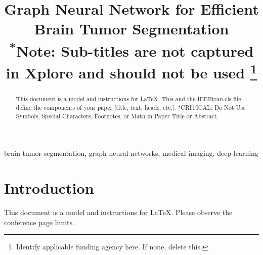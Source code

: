 \documentclass[conference]{IEEEtran}
\begin{document}
\title{Graph Neural Network for Efficient Brain Tumor Segmentation\\
{\footnotesize \textsuperscript{*}Note: Sub-titles are not captured in Xplore and
should not be used}
\thanks{Identify applicable funding agency here. If none, delete this.}
}

\author{
}

\maketitle



\begin{abstract}
This document is a model and instructions for \LaTeX.
This and the IEEEtran.cls file define the components of your paper [title, text, heads, etc.]. *CRITICAL: Do Not Use Symbols, Special Characters, Footnotes, 
or Math in Paper Title or Abstract.
\end{abstract}

\begin{IEEEkeywords}
brain tumor segmentation, graph neural networks, medical imaging, deep learning
\end{IEEEkeywords}






\section{Introduction}
This document is a model and instructions for \LaTeX. Please observe the conference page limits. 
\end{document}
